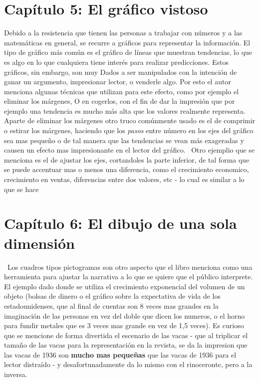 \documentclass[letterpaper, 11pt]{article}
\begin{document}
\section*{Capítulo 5: El gráfico vistoso}

Debido a la resistencia que tienen las personas a trabajar con números y a las matemáticas en general, se recurre a gráficos para representar la información. El tipo de gráfico más común es el gráfico de líneas que muestran tendencias, lo que es algo en lo que cualquiera tiene interés para realizar predicciones. Estos gráficos, sin embargo, son muy Dados a ser manipulados con la intención de ganar un argumento, impresionar lector, o venderle algo. Por esto el autor menciona algunas técnicas que utilizan para este efecto, como por ejemplo el eliminar los márgenes, O en cogerlos, con el fin de dar la impresión que por ejemplo una tendencia es mucho más alta que los valores realmente representa. Aparte de eliminar los márgenes otro truco comúnmente usado es el de comprimir o estirar los márgenes, haciendo que los \textit{pasos} entre número en los ejes del gráfico sea mas pequeño o  de tal manera que las tendencias se vean más exageradas y causen un efecto mas impresionante en el lector del gráfico.
 Otro ejemplio que se menciona es el de ajustar los ejes, cortandoles la parte inferior, de tal forma que se puede accentuar mas o menos una diferencia, como el crecimiento economico, crecimiento en ventas, diferencias entre dos valores, etc - lo cual es similar a lo que se hace 

\section*{Capítulo 6: El dibujo de una sola dimensión}

 Los cuadros tipos pictogramas son otro aspecto que el libro menciona como una herramienta para ajustar la narrativa a lo que se quiere que el público interprete. El ejemplo dado donde se utiliza el crecimiento exponencial del volumen de un objeto (bolsas de dinero o el gráfico sobre la expectativa de vida de los estadounidenses, que al final de cuentas son 8 veces mas grandes en la imaginación de las personas en vez del doble que dicen los numeros, o el horno para fundir metales que es 3 veces mas grande en vez de 1,5 veces). Es curioso que se mencione de forma divertida el escenario de las vacas - que al triplicar el tamaño de las vacas para la representación en la revista, se da la impresion que las vacas de 1936 son \textbf{mucho mas pequeñas} que las vacas de 1936 para el lector distraído - y desafortunadamente da lo mismo con el rinoceronte, pero a la inversa.
\end{document}
